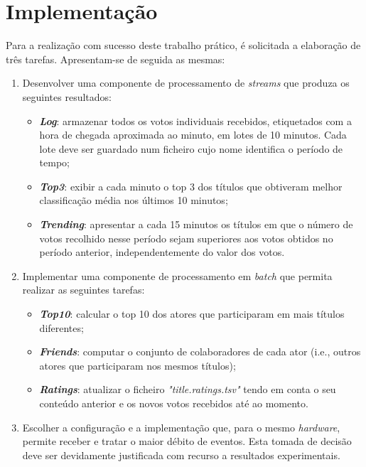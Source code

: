 \documentclass[a4paper]{report}
\begin{document}
\chapter{Implementação} \label{ch:Implementation}
\large {
    Para a realização com sucesso deste trabalho prático, é solicitada a elaboração de três tarefas. Apresentam-se de seguida as mesmas:
    \begin{enumerate}
        \item Desenvolver uma componente de processamento de \textit{streams} que produza os seguintes resultados:
        \begin{itemize}
            \item \textbf{\textit{Log}}: armazenar todos os votos individuais recebidos, etiquetados com a hora de chegada aproximada ao minuto, em lotes de 10 minutos. Cada lote deve ser guardado num ficheiro cujo nome identifica o período de tempo;
            \item \textbf{\textit{Top3}}: exibir a cada minuto o top 3 dos títulos que obtiveram melhor classificação média nos últimos 10 minutos;
            \item \textbf{\textit{Trending}}: apresentar a cada 15 minutos os títulos em que o número de votos recolhido nesse período sejam superiores aos votos obtidos no período anterior, independentemente do valor dos votos.
        \end{itemize}
        \item Implementar uma componente de processamento em \textit{batch} que permita realizar as seguintes tarefas:
        \begin{itemize}
            \item \textbf{\textit{Top10}}: calcular o top 10 dos atores que participaram em mais títulos diferentes;
            \item \textbf{\textit{Friends}}: computar o conjunto de colaboradores de cada ator (i.e., outros atores que participaram nos mesmos títulos);
            \item \textbf{\textit{Ratings}}: atualizar o ficheiro \textsl{"title.ratings.tsv"} tendo em conta o seu conteúdo anterior e os novos votos recebidos até ao momento.
        \end{itemize}
        \item Escolher a configuração e a implementação que, para o mesmo \textit{hardware}, permite receber e tratar o maior débito de eventos. Esta tomada de decisão deve ser devidamente justificada com recurso a resultados experimentais.
    \end{enumerate}
    
}
\end{document}
